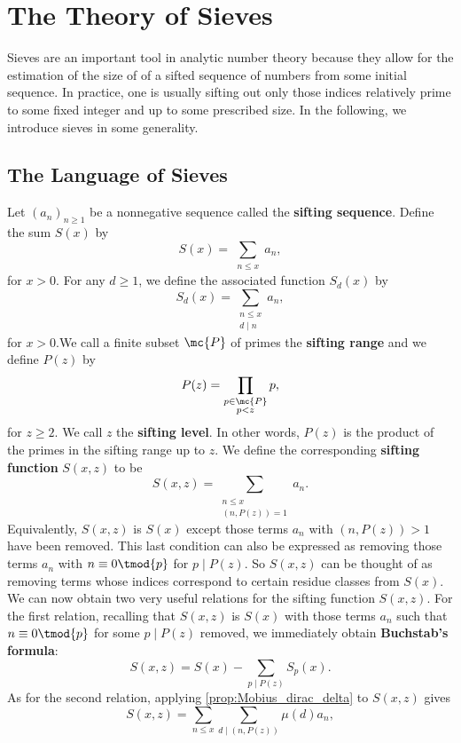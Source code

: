 \chapter{The Theory of Sieves}
  Sieves are an important tool in analytic number theory because they allow for the estimation of the size of of a sifted sequence of numbers from some initial sequence. In practice, one is usually sifting out only those indices relatively prime to some fixed integer and up to some prescribed size. In the following, we introduce sieves in some generality.
  \section{The Language of Sieves}
    Let $(a_{n})_{n \ge 1}$ be a nonnegative sequence called the \textbf{sifting sequence}. Define the sum $S(x)$ by
    \[
      S(x) = \sum_{\substack{n \le x}}a_{n},
    \]
    for $x > 0$. For any $d \ge 1$, we define the associated function $S_{d}(x)$ by
    \[
      S_{d}(x) = \sum_{\substack{n \le x \\ d \mid n}}a_{n},
    \]
    for $x > 0$.We call a finite subset $\mc{P}$ of primes the \textbf{sifting range} and we define $P(z)$ by
    \[
      P(z) = \prod_{\substack{p \in \mc{P} \\ p < z}}p,
    \]
    for $z \ge 2$. We call $z$ the \textbf{sifting level}. In other words, $P(z)$ is the product of the primes in the sifting range up to $z$. We define the corresponding \textbf{sifting function} $S(x,z)$ to be
    \[
      S(x,z) = \sum_{\substack{n \le x \\ (n,P(z)) = 1}}a_{n}.
    \]
    Equivalently, $S(x,z)$ is $S(x)$ except those terms $a_{n}$ with $(n,P(z)) > 1$ have been removed. This last condition can also be expressed as removing those terms $a_{n}$ with $n \equiv 0 \tmod{p}$ for $p \mid P(z)$. So $S(x,z)$ can be thought of as removing terms whose indices correspond to certain residue classes from $S(x)$. We can now obtain two very useful relations for the sifting function $S(x,z)$. For the first relation, recalling that $S(x,z)$ is $S(x)$ with those terms $a_{n}$ such that $n \equiv 0 \tmod{p}$ for some $p \mid P(z)$ removed, we immediately obtain \textbf{Buchstab's formula}:
    \[
      S(x,z) = S(x)-\sum_{p \mid P(z)}S_{p}(x).
    \]
    As for the second relation, applying \cref{prop:Mobius_dirac_delta} to $S(x,z)$ gives
    \[
      S(x,z) = \sum_{n \le x}\sum_{d \mid (n,P(z))}\mu(d)a_{n},
    \]
